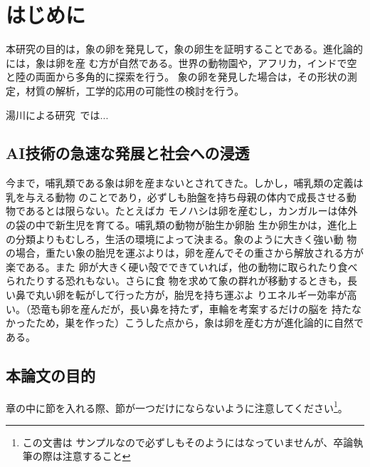 \chapter{はじめに}
本研究の目的は，象の卵を発見して，象の卵生を証明することである。進化論的には，象は卵を産
む方が自然である。世界の動物園や，アフリカ，インドで空と陸の両面から多角的に探索を行う。
象の卵を発見した場合は，その形状の測定，材質の解析，工学的応用の可能性の検討を行う。

湯川による研究~\cite{yukawa1950quantum}では...

\section{AI技術の急速な発展と社会への浸透}
今まで，哺乳類である象は卵を産まないとされてきた。しかし，哺乳類の定義は乳を与える動物
のことであり，必ずしも胎盤を持ち母親の体内で成長させる動物であるとは限らない。たとえばカ
モノハシは卵を産むし，カンガルーは体外の袋の中で新生児を育てる。哺乳類の動物が胎生か卵胎
生か卵生かは，進化上の分類よりもむしろ，生活の環境によって決まる。象のように大きく強い動
物の場合，重たい象の胎児を運ぶよりは，卵を産んでその重さから解放される方が楽である。また
卵が大きく硬い殻でできていれば，他の動物に取られたり食べられたりする恐れもない。さらに食
物を求めて象の群れが移動するときも，長い鼻で丸い卵を転がして行った方が，胎児を持ち運ぶよ
りエネルギー効率が高い。（恐竜も卵を産んだが，長い鼻を持たず，車輪を考案するだけの脳を
持たなかったため，巣を作った）こうした点から，象は卵を産む方が進化論的に自然である。

\section{本論文の目的}
章の中に節を入れる際、節が一つだけにならないように注意してください\footnote{この文書は
サンプルなので必ずしもそのようにはなっていませんが、卒論執筆の際は注意すること}。

